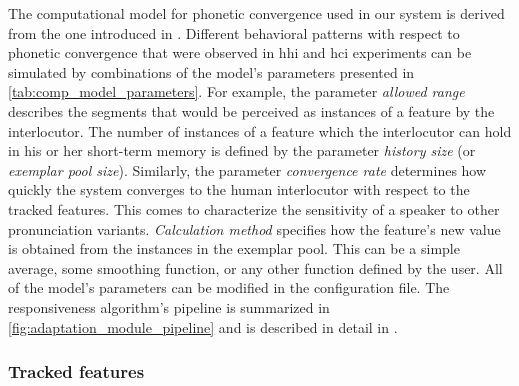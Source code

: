 The computational model for phonetic convergence used in our system is derived from the one introduced in \citet{Raveh2017Interspeech}.
Different behavioral patterns with respect to phonetic convergence that were observed in \ac{hhi} and \ac{hci} experiments \citep{Cohen2017converging, Gessinger2017Interspeech, Schweitzer2016exemplar, Babel2010dialect} can be simulated by combinations of the model's parameters presented in \cref{tab:comp_model_parameters}.
For example, the parameter \emph{allowed range} describes the segments that would be perceived as instances of a feature by the interlocutor.
The number of instances of a feature which the interlocutor can hold in his or her short-term memory is defined by the parameter \emph{history size} (or \emph{exemplar pool size}).
Similarly, the parameter \emph{convergence rate} determines how quickly the system converges to the human interlocutor with respect to the tracked features.
This comes to characterize the sensitivity of a speaker to other pronunciation variants.
\emph{Calculation method} specifies how the feature's new value is obtained from the instances in the exemplar pool.
This can be a simple average, some smoothing function, or any other function defined by the user.
All of the model's parameters can be modified in the configuration file.
The responsiveness algorithm's pipeline is summarized in \cref{fig:adaptation_module_pipeline} and is described in detail in \citet{Raveh2017Interspeech}.

\subsubsection{Tracked features}
\label{subsubsec:tracked_features}


